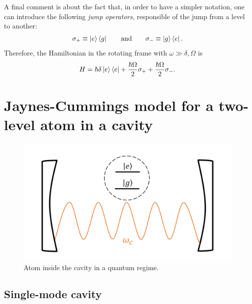 A final comment is about the fact that, in order to have a simpler notation, one can introduce the following \emph{jump operators}, responsible of the jump from a level to another:
\begin{align}
    \sigma_+ \equiv \ket{e} \bra{g} \qquad \text{and} \qquad \sigma_- \equiv \ket{g} \bra{e}. 
\end{align}
Therefore, the Hamiltonian in the rotating frame with $\omega \gg \delta, \Omega$ is 
\begin{align}
\label{eq:Hrw}
    H = \hbar \delta \ket{e}\bra{e} + \frac{\hbar \Omega}{2} \sigma_+ + \frac{\hbar \Omega}{2} \sigma_-. 
\end{align}


\section{Jaynes-Cummings model for a two-level atom in a cavity}

\begin{figure}[h]
\centering
    \includegraphics[width=0.65\linewidth]{images/AtomCavity.png}
    \caption{Atom inside the cavity in a quantum regime.}
    \label{fig:atomcavity}
\end{figure}

\subsection{Single-mode cavity}

